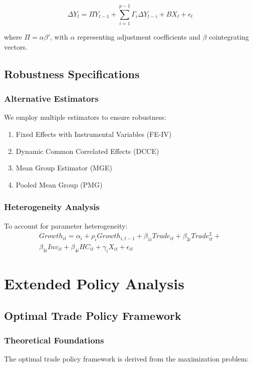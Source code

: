 \documentclass[12pt,a4paper]{article}
\theoremstyle{definition}
\begin{document}
\begin{equation}
\Delta Y_t = \Pi Y_{t-1} + \sum_{i=1}^{p-1} \Gamma_i \Delta Y_{t-i} + BX_t + \epsilon_t
\end{equation}

where $\Pi = \alpha \beta'$, with $\alpha$ representing adjustment coefficients and $\beta$ cointegrating vectors.

\subsection{Robustness Specifications}
\subsubsection{Alternative Estimators}
We employ multiple estimators to ensure robustness:
\begin{enumerate}
    \item Fixed Effects with Instrumental Variables (FE-IV)
    \item Dynamic Common Correlated Effects (DCCE)
    \item Mean Group Estimator (MGE)
    \item Pooled Mean Group (PMG)
\end{enumerate}

\subsubsection{Heterogeneity Analysis}
To account for parameter heterogeneity:
\begin{equation}
\begin{split}
Growth_{it} = \alpha_i + \rho_i Growth_{i,t-1} + \beta_{1i} Trade_{it} + \beta_{2i} Trade_{it}^2 + \\
\beta_{3i} Inv_{it} + \beta_{4i} HC_{it} + \gamma_i X_{it} + \epsilon_{it}
\end{split}
\end{equation}

\section{Extended Policy Analysis}
\subsection{Optimal Trade Policy Framework}
\subsubsection{Theoretical Foundations}
The optimal trade policy framework is derived from the maximization problem:
\end{document}

